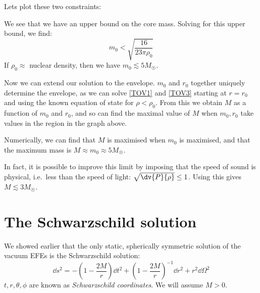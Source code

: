 \documentclass{jknotes}
\begin{document}
Lets plot these two constraints:
\begin{figure}[H]
    \centering
\end{figure}
We see that we have an upper bound on the core mass. Solving for this upper bound, we find:
\begin{equation}
    m_0 < \sqrt{\frac{16}{23\pi\rho_0}}
\end{equation}
If \(\rho_0\approx\) nuclear density, then we have \(m_0 \lesssim 5M_{\astrosun}\).

Now we can extend our solution to the envelope. \(m_0\) and \(r_0\) together uniquely determine the envelope, as we can solve \eqref{TOV1} and \eqref{TOV3} starting at \(r=r_0\) and using the known equation of state for \(\rho<\rho_0\). From this we obtain \(M\) as a function of \(m_0\) and \(r_0\), and so can find the maximal value of \(M\) when \(m_0,r_0\) take values in the region in the graph above.

Numerically, we can find that \(M\) is maximised when \(m_0\) is maximised, and that the maximum mass is \(M\approx m_0\approx5M_{\astrosun}\).

In fact, it is possible to improve this limit by imposing that the speed of sound is physical, i.e.\ less than the speed of light: \(\sqrt{\dv{P}{\rho}}\le1\). Using this gives \(M \lesssim 3M_{\astrosun}\).

\section{The Schwarzschild solution}
We showed earlier that the only static, spherically symmetric solution of the vacuum EFEs is the Schwarzschild solution:
\begin{equation}
    \dd{s}^2 = - \left( 1-\frac{2M}{r} \right)\dd{t}^2 + \left( 1-\frac{2M}{r} \right)^{-1}\dd{r}^2 + r^2\dd{\Omega}^2
\end{equation}
\(t,r,\theta,\phi\) are known as \emph{Schwarzschild coordinates}. We will assume \(M>0\).
\end{document}
